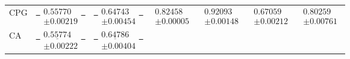 \documentclass{article}
\providecommand{\DIFaddtex}[1]{{\protect\color{blue}\uwave{#1}}} %
\providecommand{\DIFdeltex}[1]{{\protect\color{red}\sout{#1}}}                      %
\providecommand{\DIFaddFL}[1]{\DIFadd{#1}} %
\providecommand{\DIFdelFL}[1]{\DIFdel{#1}} %
\providecommand{\DIFaddbeginFL}{} %
\providecommand{\DIFaddendFL}{} %
\providecommand{\DIFdelbeginFL}{} %
\providecommand{\DIFdelendFL}{} %
\providecommand{\DIFadd}[1]{\texorpdfstring{\DIFaddtex{#1}}{#1}} %
\providecommand{\DIFdel}[1]{\texorpdfstring{\DIFdeltex{#1}}{}} %
\newcommand{\DIFscaledelfig}{0.5}
\newlength{\DIFdelgraphicswidth} %
\newlength{\DIFdelgraphicsheight} %
\newcommand{\DIFaddincludegraphics}[2][]{{\color{blue}\fbox{\DIFOincludegraphics[#1]{#2}}}} %
\newcommand{\DIFdelincludegraphics}[2][]{%
\sbox{\DIFdelgraphicsbox}{\DIFOincludegraphics[#1]{#2}}%
\settoboxwidth{\DIFdelgraphicswidth}{\DIFdelgraphicsbox} %
\settoboxtotalheight{\DIFdelgraphicsheight}{\DIFdelgraphicsbox} %
\scalebox{\DIFscaledelfig}{%
\parbox[b]{\DIFdelgraphicswidth}{\usebox{\DIFdelgraphicsbox}\\[-\baselineskip] \rule{\DIFdelgraphicswidth}{0em}}\llap{\resizebox{\DIFdelgraphicswidth}{\DIFdelgraphicsheight}{%
\setlength{\unitlength}{\DIFdelgraphicswidth}%
\begin{picture}(1,1)%
\thicklines\linethickness{2pt} %
{\color[rgb]{1,0,0}\put(0,0){\framebox(1,1){}}}%
{\color[rgb]{1,0,0}\put(0,0){\line( 1,1){1}}}%
{\color[rgb]{1,0,0}\put(0,1){\line(1,-1){1}}}%
\end{picture}%
}\hspace*{3pt}}} %
} %
\DeclareRobustCommand{\DIFaddbeginFL}{\DIFOaddbeginFL \let\includegraphics\DIFaddincludegraphics} %
\DeclareRobustCommand{\DIFaddendFL}{\DIFOaddendFL \let\includegraphics\DIFOincludegraphics} %
\DeclareRobustCommand{\DIFdelbeginFL}{\DIFOdelbeginFL \let\includegraphics\DIFdelincludegraphics} %
\DeclareRobustCommand{\DIFdelendFL}{\DIFOaddendFL \let\includegraphics\DIFOincludegraphics} %
\renewcommand{\DIFaddincludegraphics}[2][]{%
  \begingroup
  \sbox{\DIFdelgraphicsbox}{\DIFOincludegraphics[#1]{#2}}%
  \setlength{\fboxsep}{0pt}\setlength{\fboxrule}{0.8pt}%
  {\color{blue}\fbox{\resizebox{\dimexpr\wd\DIFdelgraphicsbox-2\fboxrule\relax}{!}{\usebox{\DIFdelgraphicsbox}}}}%
  \endgroup
}
\begin{document}
\begin{table}[!htbp]
\begin{tabular*}{\textwidth}{@{\extracolsep{\fill}}lcccccc@{}}
        \addlinespace[3pt]
        CPG & \DIFdelbeginFL \DIFdelFL{%
\mbox{%
$\begin{gathered}\mathbf{0.55770}\\[-2pt]\pm 0.00219\end{gathered}$
}%
}\DIFdelendFL \DIFaddbeginFL \DIFaddFL{%
\mbox{%
$\begin{gathered}0.50064\\[-2pt]\pm 0.00157\end{gathered}$
}%
}\DIFaddendFL & \DIFdelbeginFL \DIFdelFL{%
\mbox{%
$\begin{gathered}\mathbf{0.64743}\\[-2pt]\pm 0.00454\end{gathered}$
}%
}\DIFdelendFL \DIFaddbeginFL \DIFaddFL{%
\mbox{%
$\begin{gathered}\underline{0.63530}\\[-2pt]\pm 0.00396\end{gathered}$
}%
}\DIFaddendFL & $\begin{gathered}\mathbf{0.82458}\\[-2pt]\pm 0.00005\end{gathered}$ & $\begin{gathered}\mathbf{0.92093}\\[-2pt]\pm 0.00148\end{gathered}$ & $\begin{gathered}\mathbf{0.67059}\\[-2pt]\pm 0.00212\end{gathered}$ & $\begin{gathered}\mathbf{0.80259}\\[-2pt]\pm 0.00761\end{gathered}$ \\
        \addlinespace[3pt]
        CA & \DIFdelbeginFL \DIFdelFL{%
\mbox{%
$\begin{gathered}\underline{0.55774}\\[-2pt]\pm 0.00222\end{gathered}$
}%
}\DIFdelendFL \DIFaddbeginFL \DIFaddFL{%
\mbox{%
$\begin{gathered}\underline{0.50063}\\[-2pt]\pm 0.00159\end{gathered}$
}%
}\DIFaddendFL & \DIFdelbeginFL \DIFdelFL{%
\mbox{%
$\begin{gathered}\underline{0.64786}\\[-2pt]\pm 0.00404\end{gathered}$
}}
\end{tabular*}
\end{table}
\end{document}
